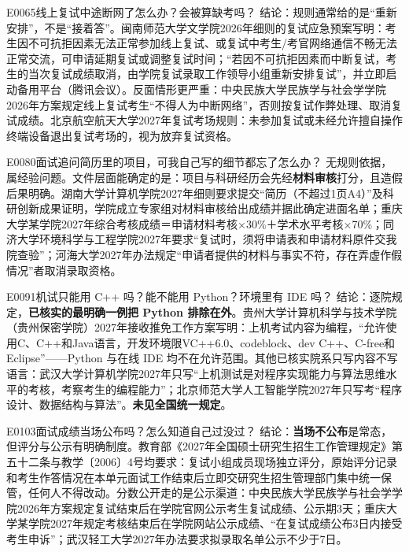 \begin{qa}{E0065}{线上复试中途断网了怎么办？会被算缺考吗？}
结论：规则通常给的是“重新安排”，不是“接着答”。闽南师范大学文学院2026年细则的复试应急预案写明：考生因不可抗拒因素无法正常参加线上复试、或复试中考生/考官网络通信不畅无法正常交流，可申请延期复试或调整复试时间；“若因不可抗拒因素而中断复试，考生的当次复试成绩取消，由学院复试录取工作领导小组重新安排复试”，并立即启动备用平台（腾讯会议）。反面情形更严重：中央民族大学民族学与社会学学院2026年方案规定线上复试考生“不得人为中断网络”，否则按复试作弊处理、取消复试成绩。北京航空航天大学2027年复试考场规则：未参加复试或未经允许擅自操作终端设备退出复试考场的，视为放弃复试资格。
\end{qa}

\begin{qa}{E0080}{面试追问简历里的项目，可我自己写的细节都忘了怎么办？}
无规则依据，属经验问题。文件层面能确定的是：项目与科研经历会先经\textbf{材料审核}打分，且造假后果明确。湖南大学计算机学院2027年细则要求提交“简历（不超过1页A4）”及科研创新成果证明，学院成立专家组对材料审核给出成绩并据此确定进面名单；重庆大学某学院2027年综合考核成绩＝申请材料考核×30\%＋学术水平考核×70\%；同济大学环境科学与工程学院2027年要求“复试时，须将申请表和申请材料原件交我院查验”；河海大学2027年办法规定“申请者提供的材料与事实不符，存在弄虚作假情况”者取消录取资格。
\end{qa}

\begin{qa}{E0091}{机试只能用 C++ 吗？能不能用 Python？环境里有 IDE 吗？}
结论：逐院规定，\textbf{已核实的最明确一例把 Python 排除在外}。贵州大学计算机科学与技术学院（贵州保密学院）2027年接收推免工作方案写明：上机考试内容为编程，“允许使用C、C++和Java语言，开发环境限VC++6.0、codeblock、dev C++、C-free和Eclipse”——Python 与在线 IDE 均不在允许范围。其他已核实院系只写内容不写语言：武汉大学计算机学院2027年只写“上机测试是对程序实现能力与算法思维水平的考核，考察考生的编程能力”；北京师范大学人工智能学院2027年只写考“程序设计、数据结构与算法”。\textbf{未见全国统一规定}。
\end{qa}

\begin{qa}{E0103}{面试成绩当场公布吗？怎么知道自己过没过？}
结论：\textbf{当场不公布}是常态，但评分与公示有明确制度。教育部《2027年全国硕士研究生招生工作管理规定》第五十二条与教学〔2006〕4号均要求：复试小组成员现场独立评分，原始评分记录和考生作答情况在本单元面试工作结束后立即交研究生招生管理部门集中统一保管，任何人不得改动。分数公开走的是公示渠道：中央民族大学民族学与社会学学院2026年方案规定复试结束后在学院官网公示考生复试成绩、公示期3天；重庆大学某学院2027年规定考核结束后在学院网站公示成绩、“在复试成绩公布3日内接受考生申诉”；武汉轻工大学2027年办法要求拟录取名单公示不少于7日。
\end{qa}

